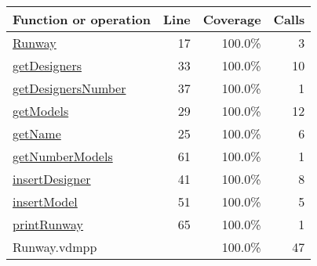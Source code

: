 \begin{longtable}{|l|r|r|r|}
\hline
Function or operation & Line & Coverage & Calls \\
\hline
\hline
\hyperref[Runway:17]{Runway} & 17&100.0\% & 3 \\
\hline
\hyperref[getDesigners:33]{getDesigners} & 33&100.0\% & 10 \\
\hline
\hyperref[getDesignersNumber:37]{getDesignersNumber} & 37&100.0\% & 1 \\
\hline
\hyperref[getModels:29]{getModels} & 29&100.0\% & 12 \\
\hline
\hyperref[getName:25]{getName} & 25&100.0\% & 6 \\
\hline
\hyperref[getNumberModels:61]{getNumberModels} & 61&100.0\% & 1 \\
\hline
\hyperref[insertDesigner:41]{insertDesigner} & 41&100.0\% & 8 \\
\hline
\hyperref[insertModel:51]{insertModel} & 51&100.0\% & 5 \\
\hline
\hyperref[printRunway:65]{printRunway} & 65&100.0\% & 1 \\
\hline
\hline
Runway.vdmpp & & 100.0\% & 47 \\
\hline
\end{longtable}

